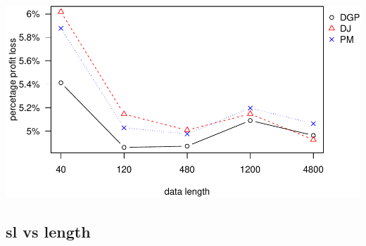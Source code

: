 \documentclass[
]{article}
\begin{document}
\includegraphics{runif-plot_files/figure-latex/ppl-1.pdf}

\hypertarget{sl-vs-length}{%
\subsection{sl vs length}\label{sl-vs-length}}
\end{document}
